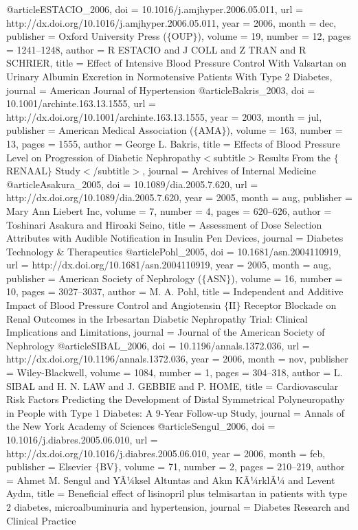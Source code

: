 @article{ESTACIO_2006,
	doi = {10.1016/j.amjhyper.2006.05.011},
	url = {http://dx.doi.org/10.1016/j.amjhyper.2006.05.011},
	year = 2006,
	month = {dec},
	publisher = {Oxford University Press ($\lbrace$OUP$\rbrace$)},
	volume = {19},
	number = {12},
	pages = {1241--1248},
	author = {R ESTACIO and J COLL and Z TRAN and R SCHRIER},
	title = {Effect of Intensive Blood Pressure Control With Valsartan on Urinary Albumin Excretion in Normotensive Patients With Type 2 Diabetes},
	journal = {American Journal of Hypertension}
}
@article{Bakris_2003,
	doi = {10.1001/archinte.163.13.1555},
	url = {http://dx.doi.org/10.1001/archinte.163.13.1555},
	year = 2003,
	month = {jul},
	publisher = {American Medical Association ($\lbrace$AMA$\rbrace$)},
	volume = {163},
	number = {13},
	pages = {1555},
	author = {George L. Bakris},
	title = {Effects of Blood Pressure Level on Progression of Diabetic Nephropathy$\less$subtitle$\greater$Results From the $\lbrace$RENAAL$\rbrace$ Study$\less$/subtitle$\greater$},
	journal = {Archives of Internal Medicine}
}
@article{Asakura_2005,
	doi = {10.1089/dia.2005.7.620},
	url = {http://dx.doi.org/10.1089/dia.2005.7.620},
	year = 2005,
	month = {aug},
	publisher = {Mary Ann Liebert Inc},
	volume = {7},
	number = {4},
	pages = {620--626},
	author = {Toshinari Asakura and Hiroaki Seino},
	title = {Assessment of Dose Selection Attributes with Audible Notification in Insulin Pen Devices},
	journal = {Diabetes Technology {\&} Therapeutics}
}
@article{Pohl_2005,
	doi = {10.1681/asn.2004110919},
	url = {http://dx.doi.org/10.1681/asn.2004110919},
	year = 2005,
	month = {aug},
	publisher = {American Society of Nephrology ($\lbrace$ASN$\rbrace$)},
	volume = {16},
	number = {10},
	pages = {3027--3037},
	author = {M. A. Pohl},
	title = {Independent and Additive Impact of Blood Pressure Control and Angiotensin $\lbrace$II$\rbrace$ Receptor Blockade on Renal Outcomes in the Irbesartan Diabetic Nephropathy Trial: Clinical Implications and Limitations},
	journal = {Journal of the American Society of Nephrology}
}
@article{SIBAL_2006,
	doi = {10.1196/annals.1372.036},
	url = {http://dx.doi.org/10.1196/annals.1372.036},
	year = 2006,
	month = {nov},
	publisher = {Wiley-Blackwell},
	volume = {1084},
	number = {1},
	pages = {304--318},
	author = {L. SIBAL and H. N. LAW and J. GEBBIE and P. HOME},
	title = {Cardiovascular Risk Factors Predicting the Development of Distal Symmetrical Polyneuropathy in People with Type 1 Diabetes: A 9-Year Follow-up Study},
	journal = {Annals of the New York Academy of Sciences}
}
@article{Sengul_2006,
	doi = {10.1016/j.diabres.2005.06.010},
	url = {http://dx.doi.org/10.1016/j.diabres.2005.06.010},
	year = 2006,
	month = {feb},
	publisher = {Elsevier $\lbrace$BV$\rbrace$},
	volume = {71},
	number = {2},
	pages = {210--219},
	author = {Ahmet M. Sengul and YÃ¼ksel Altuntas and Ak{\i}n KÃ¼rklÃ¼ and Levent Ayd{\i}n},
	title = {Beneficial effect of lisinopril plus telmisartan in patients with type 2 diabetes, microalbuminuria and hypertension},
	journal = {Diabetes Research and Clinical Practice}
}
